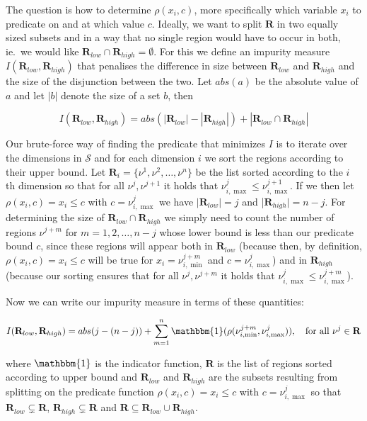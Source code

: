The question is how to determine $\rho(x_i,c)$, more specifically which variable
$x_i$ to predicate on and at which value $c$. Ideally, we want to split
$\mathbf{R}$ in two equally sized subsets and in a way that no single region
would have to occur in both, ie.\ we would like $\mathbf{R}_{low} \cap
\mathbf{R}_{high} = \emptyset$. For this we define an impurity measure
$I(\mathbf{R}_{low},\mathbf{R}_{high})$ that penalises the difference in size
between $\mathbf{R}_{low}$ and $\mathbf{R}_{high}$ and the size of the
disjunction between the two. Let $abs(a)$ be the absolute value of $a$ and let
$|b|$ denote the size of a set $b$, then

\[
    I(\mathbf{R}_{low}, \mathbf{R}_{high})  = abs(|\mathbf{R}_{low}| -
    |\mathbf{R}_{high}|) + |\mathbf{R}_{low} \cap \mathbf{R}_{high}|
\]


Our brute-force way of finding the predicate that minimizes $I$ is to iterate
over the dimensions in $\mathcal{S}$ and for each dimension $i$ we sort the
regions according to their upper bound. Let $\mathbf{R}_i = \{ \nu^1, \nu^2,
\ldots, \nu^n \}$ be the list sorted according to the $i$ th dimension so that
for all $\nu^j, \nu^{j+1}$ it holds that $\nu^{j}_{i,\max} \le
\nu^{j+1}_{i,\max}$. If we then let $\rho(x_i,c) = x_i \le c$ with $c =
\nu^{j}_{i,\max}$ we have $|\mathbf{R}_{low}| = j$ and |$\mathbf{R}_{high}| = n
- j$. For determining the size of $\mathbf{R}_{low} \cap \mathbf{R}_{high}$ we
simply need to count the number of regions $\nu^{j+m}$ for $m = 1, 2, \ldots,
n-j$ whose lower bound is less than our predicate bound $c$, since these regions
will appear both in $\mathbf{R}_{low}$ (because then, by definition, $\rho(x_i,c) = x_i
\le c$ will be true for $x_i = \nu^{j+m}_{i,\min}$ and $c = \nu^{j}_{i,\max}$)
and in $\mathbf{R}_{high}$ (because our sorting ensures that for all
$\nu^{j},\nu^{j+m}$ it holds that $\nu^{j}_{i,\max} \le \nu^{j+m}_{i,\max}$).

Now we can write our impurity measure in terms of these quantities:

\[
    I(\mathbf{R}_{low}, \mathbf{R}_{high}) = abs(j - (n - j)) +
    \sum^{n}_{m=1} \mathbbm{1}(\rho(\nu^{j+m}_{i,\min},\nu^{j}_{i,\max})), \quad
    \text{for all }\nu^{j} \in \mathbf{R}
\] 

where $\mathbbm{1}$ is the indicator function, $\mathbf{R}$ is the list of
regions sorted according to upper bound and $\mathbf{R}_{low}$ and
$\mathbf{R}_{high}$ are the subsets resulting from splitting on the predicate
function $\rho(x_i,c) = x_i \le c$ with $c = \nu^{j}_{i,\max}$ so that
$\mathbf{R}_{low} \subsetneq \mathbf{R}$, $\mathbf{R}_{high} \subsetneq
\mathbf{R}$ and $\mathbf{R} \subseteq \mathbf{R}_{low} \cup \mathbf{R}_{high}$.

